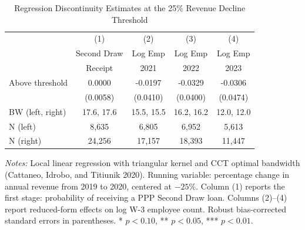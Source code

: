\begin{table}[H]
\centering
\caption{Regression Discontinuity Estimates at the 25\% Revenue Decline Threshold}
\label{tab:rdd}
\begin{threeparttable}
\begin{tabular}{l*{4}{c}}
\toprule
 & (1) & (2) & (3) & (4) \\
 & Second Draw & Log Emp & Log Emp & Log Emp \\
 & Receipt & 2021 & 2022 & 2023 \\
\midrule
Above threshold & 0.0000 & -0.0197 & -0.0329 & -0.0306 \\
 & (0.0058) & (0.0410) & (0.0400) & (0.0474) \\
\addlinespace
BW (left, right) & 17.6, 17.6 & 15.5, 15.5 & 16.2, 16.2 & 12.0, 12.0 \\
N (left) & 8,635 & 6,805 & 6,952 & 5,613 \\
N (right) & 24,256 & 17,157 & 18,393 & 11,447 \\
\bottomrule
\end{tabular}
\begin{tablenotes}[flushleft]
\small
\item \textit{Notes:} Local linear regression with triangular kernel and CCT optimal bandwidth (Cattaneo, Idrobo, and Titiunik 2020). Running variable: percentage change in annual revenue from 2019 to 2020, centered at $-25\%$. Column (1) reports the first stage: probability of receiving a PPP Second Draw loan. Columns (2)--(4) report reduced-form effects on log W-3 employee count. Robust bias-corrected standard errors in parentheses. * $p<0.10$, ** $p<0.05$, *** $p<0.01$.
\end{tablenotes}
\end{threeparttable}
\end{table}
